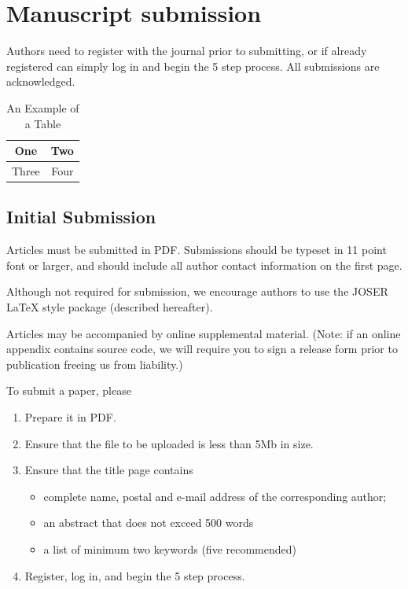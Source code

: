 \documentclass[10pt,journal,compsoc]{joser1}
\begin{document}
\section{Manuscript submission}
Authors need to register with the journal prior to submitting, or if already registered can
simply log in and begin the 5 step process.
All submissions are acknowledged.

%
\begin{table}[!t]
\renewcommand{\arraystretch}{1.3}
\caption{An Example of a Table}
\label{table_example}
\centering
\begin{tabular}{|c||c|}
\hline
One & Two\\
\hline
Three & Four\\
\hline
\end{tabular}
\end{table}

\subsection{Initial Submission}
Articles must be submitted in PDF. Submissions should be typeset
in 11 point font or larger, and should include all author contact
information on the first page.

Although not required for submission, we encourage authors to use
the JOSER LaTeX style package (described hereafter).

Articles may be accompanied by online supplemental material.
(Note: if an online appendix contains source code, we will require
you to sign a release form prior to publication freeing us from
liability.)

To submit a paper, please
\begin{enumerate}
   \item Prepare it in PDF.
   \item Ensure that the file to be uploaded is less than 5Mb in size.
   \item Ensure that the title page contains
   \begin{itemize}
          \item complete name, postal and e-mail address of the corresponding author;
          \item an abstract that does not exceed 500 words
          \item a list of minimum two keywords (five recommended)
   \end{itemize}
   \item Register, log in, and begin the 5 step process.
\end{enumerate}
\end{document}
